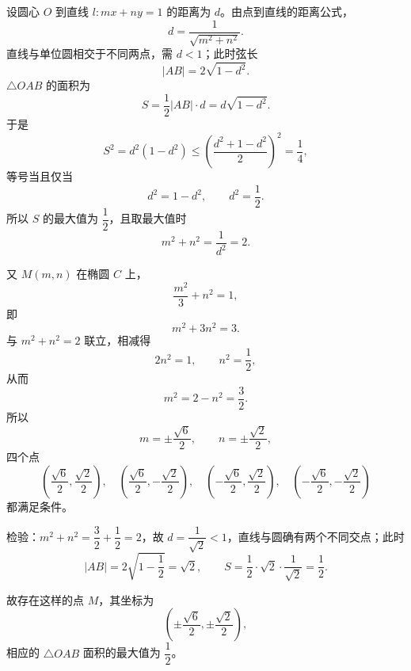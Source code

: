 \begin{answer}
设圆心 $O$ 到直线 $l:mx+ny=1$ 的距离为 $d$。由点到直线的距离公式，
\nopagebreak[4]
\[d=\frac1{\sqrt{m^2+n^2}}.\]
直线与单位圆相交于不同两点，需 $d<1$；此时弦长
\nopagebreak[4]
\[|AB|=2\sqrt{1-d^2}.\]
$\triangle OAB$ 的面积为
\nopagebreak[4]
\[S=\frac12|AB|\cdot d=d\sqrt{1-d^2}.\]
于是
\nopagebreak[4]
\[S^2=d^2(1-d^2)\leqslant\left(\frac{d^2+1-d^2}{2}\right)^2=\frac14,\]
等号当且仅当
\nopagebreak[4]
\[d^2=1-d^2,\qquad d^2=\frac12.\]
所以 $S$ 的最大值为 $\dfrac12$，且取最大值时
\nopagebreak[4]
\[m^2+n^2=\frac1{d^2}=2.\]

又 $M(m,n)$ 在椭圆 $C$ 上，
\nopagebreak[4]
\[\frac{m^2}3+n^2=1,\]
即
\nopagebreak[4]
\[m^2+3n^2=3.\]
与 $m^2+n^2=2$ 联立，相减得
\nopagebreak[4]
\[2n^2=1,\qquad n^2=\frac12,\]
从而
\nopagebreak[4]
\[m^2=2-n^2=\frac32.\]
所以
\nopagebreak[4]
\[m=\pm\frac{\sqrt6}2,\qquad n=\pm\frac{\sqrt2}2,\]
四个点
\nopagebreak[4]
\[\left(\frac{\sqrt6}2,\frac{\sqrt2}2\right),\quad
\left(\frac{\sqrt6}2,-\frac{\sqrt2}2\right),\quad
\left(-\frac{\sqrt6}2,\frac{\sqrt2}2\right),\quad
\left(-\frac{\sqrt6}2,-\frac{\sqrt2}2\right)\]
都满足条件。

检验：$m^2+n^2=\dfrac32+\dfrac12=2$，故 $d=\dfrac1{\sqrt2}<1$，直线与圆确有两个不同交点；此时
\nopagebreak[4]
\[|AB|=2\sqrt{1-\frac12}=\sqrt2,\qquad
S=\frac12\cdot\sqrt2\cdot\frac1{\sqrt2}=\frac12.\]

故存在这样的点 $M$，其坐标为
\nopagebreak[4]
\[\left(\pm\frac{\sqrt6}2,\pm\frac{\sqrt2}2\right),\]
相应的 $\triangle OAB$ 面积的最大值为 $\dfrac12$。



\end{answer}
